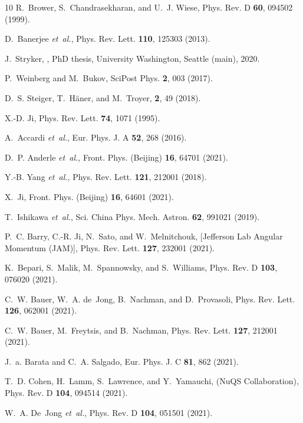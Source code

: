 \documentclass[aps,prl,twocolumn,superscriptaddress,notitlepage,nofootinbib]{revtex4-1}
\begin{document}
\begin{thebibliography}{10}
R.~Brower, S.~Chandrasekharan, and U.~J. Wiese,
\newblock Phys. Rev. D {\bf 60}, 094502 (1999).

D.~Banerjee {\em et~al.},
\newblock Phys. Rev. Lett. {\bf 110}, 125303 (2013).

J.~Stryker,
,
\newblock PhD thesis, University Washington, Seattle (main), 2020.

P.~Weinberg and M.~Bukov,
\newblock SciPost Phys. {\bf 2}, 003 (2017).

D.~S. Steiger, T.~H{\"{a}}ner, and M.~Troyer,
 {\bf 2}, 49 (2018).

X.-D. Ji,
\newblock Phys. Rev. Lett. {\bf 74}, 1071 (1995).

A.~Accardi {\em et~al.},
\newblock Eur. Phys. J. A {\bf 52}, 268 (2016).

D.~P. Anderle {\em et~al.},
\newblock Front. Phys. (Beijing) {\bf 16}, 64701 (2021).

Y.-B. Yang {\em et~al.},
\newblock Phys. Rev. Lett. {\bf 121}, 212001 (2018).

X.~Ji,
\newblock Front. Phys. (Beijing) {\bf 16}, 64601 (2021).

T.~Ishikawa {\em et~al.},
\newblock Sci. China Phys. Mech. Astron. {\bf 62}, 991021 (2019).

P.~C. Barry, C.-R. Ji, N.~Sato, and W.~Melnitchouk, [Jefferson Lab Angular
  Momentum (JAM)],
\newblock Phys. Rev. Lett. {\bf 127}, 232001 (2021).

K.~Bepari, S.~Malik, M.~Spannowsky, and S.~Williams,
\newblock Phys. Rev. D {\bf 103}, 076020 (2021).

C.~W. Bauer, W.~A. de~Jong, B.~Nachman, and D.~Provasoli,
\newblock Phys. Rev. Lett. {\bf 126}, 062001 (2021).

C.~W. Bauer, M.~Freytsis, and B.~Nachman,
\newblock Phys. Rev. Lett. {\bf 127}, 212001 (2021).

J.~a. Barata and C.~A. Salgado,
\newblock Eur. Phys. J. C {\bf 81}, 862 (2021).

T.~D. Cohen, H.~Lamm, S.~Lawrence, and Y.~Yamauchi, (NuQS Collaboration),
\newblock Phys. Rev. D {\bf 104}, 094514 (2021).

W.~A. De~Jong {\em et~al.},
\newblock Phys. Rev. D {\bf 104}, 051501 (2021).

\end{thebibliography}
\end{document}
